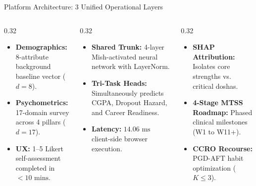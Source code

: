 \documentclass[aspectratio=169,10pt]{beamer}
\begin{document}
\begin{frame}{Platform Architecture: 3 Unified Operational Layers}
\begin{columns}[T]
\begin{column}{0.32\textwidth}
\begin{tcolorbox}[colframe=subhead,colbacktitle=subhead,colback=neutralbg,title=\textbf{Layer 1: Input Ingestion}]
\scriptsize
\begin{itemize}
    \item \textbf{Demographics:} 8-attribute background baseline vector ($d=8$).
    \item \textbf{Psychometrics:} 17-domain survey across 4 pillars ($d=17$).
    \item \textbf{UX:} 1--5 Likert self-assessment completed in $<10\text{ mins}$.
\end{itemize}
\end{tcolorbox}
\end{column}

\begin{column}{0.32\textwidth}
\begin{tcolorbox}[colframe=howframe,colbacktitle=howframe,colback=howbg,title=\textbf{Layer 2: Multi-Task Neural Trunk}]
\scriptsize
\begin{itemize}
    \item \textbf{Shared Trunk:} 4-layer Mish-activated neural network with LayerNorm.
    \item \textbf{Tri-Task Heads:} Simultaneously predicts CGPA, Dropout Hazard, and Career Readiness.
    \item \textbf{Latency:} $14.06\text{ ms}$ client-side browser execution.
\end{itemize}
\end{tcolorbox}
\end{column}

\begin{column}{0.32\textwidth}
\begin{tcolorbox}[colframe=outframe,colbacktitle=outframe,colback=outbg,title=\textbf{Layer 3: Explainable Clinical Action}]
\scriptsize
\begin{itemize}
    \item \textbf{SHAP Attribution:} Isolates core strengths vs. critical doshas.
    \item \textbf{4-Stage MTSS Roadmap:} Phased clinical milestones (W1 to W11+).
    \item \textbf{CCRO Recourse:} PGD-AFT habit optimization ($K \le 3$).
\end{itemize}
\end{tcolorbox}
\end{column}
\end{columns}
\end{frame}
\end{document}
